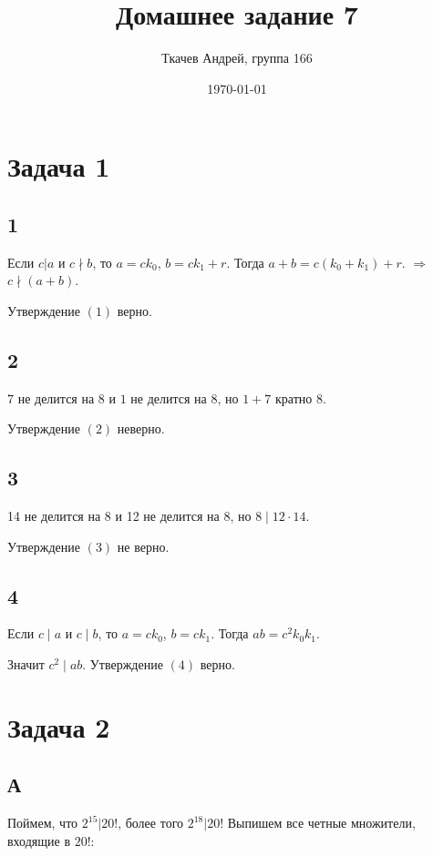 \documentclass{article}
\title{Домашнее задание 7}
\author{Ткачев Андрей, группа 166}
\date{\today}
\begin{document}
	\maketitle
	
	\section{Задача 1}
	
	\subsection{1}
	
	 Если $c|a$ и $c\nmid b$, то $a = ck_0$, $b = ck_1 + r$. Тогда $a + b = c(k_0 + k_1) + r$. $\Rightarrow$ $c \nmid (a + b)$.
	 
	 Утверждение $(1)$ верно.
	
	\subsection{2}
	
	$ 7 $ не делится на $ 8 $ и $ 1 $ не делится на $ 8 $, но $ 1 + 7 $ кратно $ 8 $.
	
	Утверждение $(2)$ неверно.
	
	\subsection{3}
	
	14 не делится на 8 и 12 не делится на 8, но $8 \mid 12 \cdot 14$.
	
	Утверждение $(3)$ не верно.
	
	\subsection{4}
	
	Если $c\mid a$ и $c\mid b$, то $a = ck_0$, $b = ck_1$. Тогда
	$ab = c^2k_0k_1$.
	
	Значит $c^2\mid ab$. Утверждение $(4)$ верно.
	
	\section{Задача 2}
	
	\subsection{А}

	Поймем, что $2^{15} | 20!$, более того $2^{18} | 20!$ Выпишем все четные множители, входящие в $20!$:
	
\end{document}
